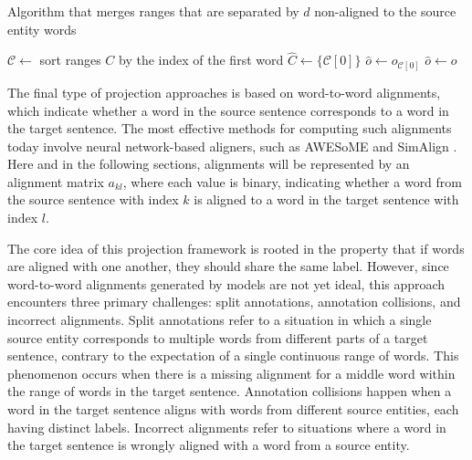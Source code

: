 \begin{algorithm}
  \caption{Algorithm that merges ranges that are separated by \( d \) non-aligned to the source entity words}
  \label{alg:merge}


  \( \mathcal{C} \gets \) sort ranges \(C\) by the index of the first word \;
  \( \hat{C} \gets \{ \mathcal{C}[0] \} \)  \;
  \( \hat{o} \gets o_{\mathcal{C}[0]} \) \;
  {
    \( \hat{o} \gets o \) \;
  }
\end{algorithm}

The final type of projection approaches is based on word-to-word alignments, which indicate whether a
word in the source sentence corresponds to a word in the target sentence. The most effective methods
for computing such alignments today involve neural network-based aligners, such as
AWESoME \cite{dou-neubig-2021-word} and SimAlign \cite{jalili-sabet-etal-2020-simalign}.
Here and in the following sections, alignments will be represented by an alignment matrix \( a_{kl} \), where
each value is binary, indicating whether a word from the source sentence with
index \( k \) is aligned to a word in the target sentence with index \( l \).

The core idea of this projection framework is rooted in the property that if words are aligned with
one another, they should share the same label. However, since word-to-word alignments
generated by models are not yet ideal, this approach
encounters three primary challenges: split annotations, annotation collisions, and incorrect alignments.
Split annotations refer to a situation in which a single source entity corresponds to multiple words
from different parts of a target sentence, contrary to the expectation of a single continuous range
of words. This phenomenon occurs when there is a missing alignment for a middle word within the
range of words in the target sentence.
Annotation collisions happen when a word in the target sentence aligns with words from different source
entities, each having distinct labels. Incorrect alignments refer to situations where a word in the
target sentence is wrongly aligned with a word from a source entity.

